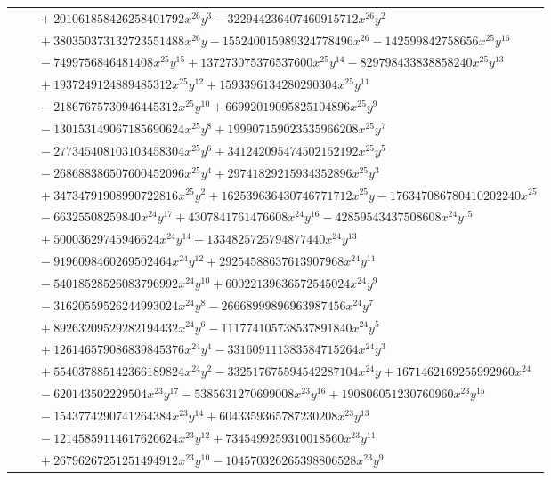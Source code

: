 \documentclass[11pt]{article}
\begin{document}
\begin{longtable}{@{}ll@{}}
 & $\quad +201061858426258401792x^{26}y^{3}-322944236407460915712x^{26}y^{2}$\\
 & $\quad +380350373132723551488x^{26}y-155240015989324778496x^{26}-142599842758656x^{25}y^{16}$\\
 & $\quad -7499756846481408x^{25}y^{15}+137273075376537600x^{25}y^{14}-829798433838858240x^{25}y^{13}$\\
 & $\quad +1937249124889485312x^{25}y^{12}+1593396134280290304x^{25}y^{11}$\\
 & $\quad -21867675730946445312x^{25}y^{10}+66992019095825104896x^{25}y^{9}$\\
 & $\quad -130153149067185690624x^{25}y^{8}+199907159023535966208x^{25}y^{7}$\\
 & $\quad -277345408103103458304x^{25}y^{6}+341242095474502152192x^{25}y^{5}$\\
 & $\quad -268688386507600452096x^{25}y^{4}+29741829215934352896x^{25}y^{3}$\\
 & $\quad +34734791908990722816x^{25}y^{2}+162539636430746771712x^{25}y-176347086780410202240x^{25}$\\
 & $\quad -66325508259840x^{24}y^{17}+4307841761476608x^{24}y^{16}-42859543437508608x^{24}y^{15}$\\
 & $\quad +50003629745946624x^{24}y^{14}+1334825725794877440x^{24}y^{13}$\\
 & $\quad -9196098460269502464x^{24}y^{12}+29254588637613907968x^{24}y^{11}$\\
 & $\quad -54018528526083796992x^{24}y^{10}+60022139636572545024x^{24}y^{9}$\\
 & $\quad -31620559526244993024x^{24}y^{8}-26668999896963987456x^{24}y^{7}$\\
 & $\quad +89263209529282194432x^{24}y^{6}-111774105738537891840x^{24}y^{5}$\\
 & $\quad +126146579086839845376x^{24}y^{4}-331609111383584715264x^{24}y^{3}$\\
 & $\quad +554037885142366189824x^{24}y^{2}-332517675594542287104x^{24}y+1671462169255992960x^{24}$\\
 & $\quad -620143502229504x^{23}y^{17}-5385631270699008x^{23}y^{16}+190806051230760960x^{23}y^{15}$\\
 & $\quad -1543774290741264384x^{23}y^{14}+6043359365787230208x^{23}y^{13}$\\
 & $\quad -12145859114617626624x^{23}y^{12}+7345499259310018560x^{23}y^{11}$\\
 & $\quad +26796267251251494912x^{23}y^{10}-104570326265398806528x^{23}y^{9}$\\

\end{longtable}
\end{document}
